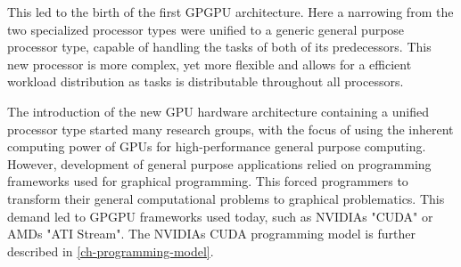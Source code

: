 This led to the birth of the first GPGPU architecture. 
Here a narrowing from the two specialized processor types were unified to a generic general purpose processor type, capable of handling the tasks of both of its predecessors.
This new processor is more complex, yet more flexible and allows for a efficient workload distribution as tasks is distributable throughout all processors.

The introduction of the new GPU hardware architecture containing a unified processor type started many research groups, with the focus of using the inherent computing power of GPUs for high-performance general purpose computing.
However, development of general purpose applications relied on programming frameworks used for graphical programming.
This forced programmers to transform their general computational problems to graphical problematics.
This demand led to GPGPU frameworks used today, such as NVIDIAs "CUDA" or AMDs "ATI Stream".
The NVIDIAs CUDA programming model is further described in \cref{ch-programming-model}.


